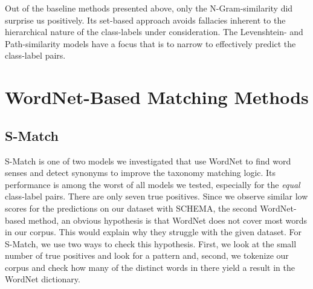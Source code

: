 Out of the baseline methods presented above, only the N-Gram-similarity did surprise us positively.
Its set-based approach avoids fallacies inherent to the hierarchical nature of the class-labels under consideration.
The Levenshtein- and Path-similarity models have a focus that is to narrow to effectively predict the class-label
pairs.

\section{WordNet-Based Matching Methods}

\subsection{S-Match}

S-Match is one of two models we investigated that use WordNet to find word senses and detect synonyms to improve
the taxonomy matching logic.
Its performance is among the worst of all models we tested, especially for the \emph{equal} class-label pairs.
There are only seven true positives.
Since we observe similar low scores for the predictions on our dataset with SCHEMA, the second WordNet-based method,
an obvious hypothesis is that WordNet does not cover most words in our corpus.
This  would explain why they struggle with the given dataset.
For S-Match, we use two ways to check this hypothesis.
First, we look  at the small number of true positives and look for a pattern and, second, we tokenize our
corpus and check how many of the distinct words in there yield a result in the WordNet dictionary.

